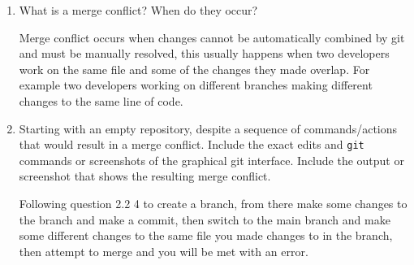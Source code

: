 \documentclass[10pt,twocolumn]{article}
\begin{document}
\begin{enumerate}
\item What is a merge conflict? When do they occur?

\medskip
Merge conflict occurs when changes cannot be automatically combined by git and must be manually resolved, this usually happens when two developers work on the same file and some of the changes they made overlap. For example two developers working on different branches making different changes to the same line of code.
\medskip

\item Starting with an empty repository, despite a sequence of commands/actions that would result in a merge conflict. Include the exact edits and \texttt{git} commands or screenshots of the graphical git interface. Include the output or screenshot that shows the resulting merge conflict.

\medskip
Following question 2.2 4 to create a branch, from there make some changes to the branch and make a commit, then switch to the main branch and make some different changes to the same file you made changes to in the branch, then attempt to merge and you will be met with an error.


\end{enumerate}
\end{document}
